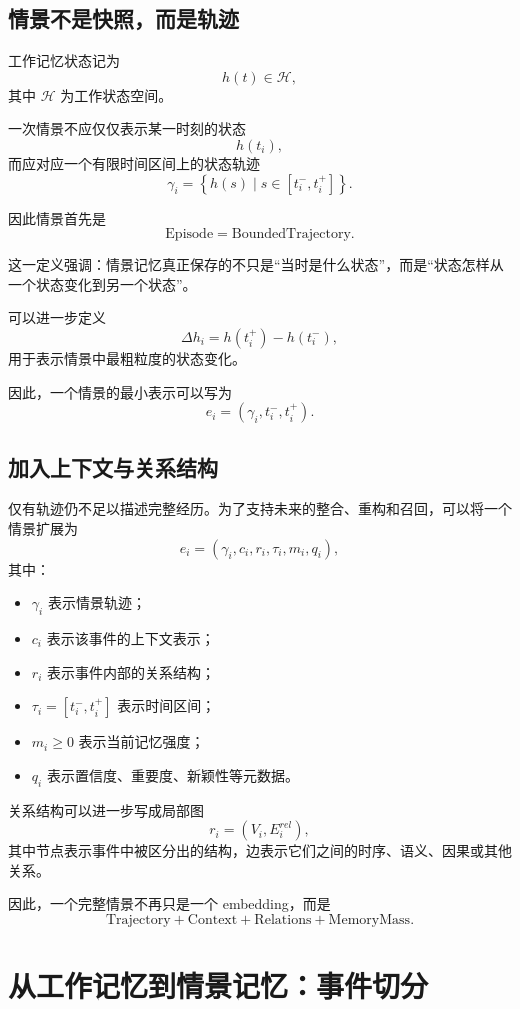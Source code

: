 \subsection{情景不是快照，而是轨迹}

工作记忆状态记为
\[
h(t)\in\mathcal{H},
\]
其中 $\mathcal{H}$ 为工作状态空间。

一次情景不应仅仅表示某一时刻的状态
\[
h(t_i),
\]
而应对应一个有限时间区间上的状态轨迹
\[
\gamma_i
=
\left\{
h(s)
\mid
s\in[t_i^{-},t_i^{+}]
\right\}.
\]

因此情景首先是
\[
\boxed{
\mathrm{Episode}
=
\mathrm{BoundedTrajectory}.
}
\]

这一定义强调：情景记忆真正保存的不只是“当时是什么状态”，而是“状态怎样从一个状态变化到另一个状态”。

可以进一步定义
\[
\Delta h_i
=
h(t_i^{+})
-
h(t_i^{-}),
\]
用于表示情景中最粗粒度的状态变化。

因此，一个情景的最小表示可以写为
\[
e_i
=
\left(
\gamma_i,
t_i^{-},
t_i^{+}
\right).
\]

\subsection{加入上下文与关系结构}

仅有轨迹仍不足以描述完整经历。为了支持未来的整合、重构和召回，可以将一个情景扩展为
\[
\boxed{
e_i
=
\left(
\gamma_i,
c_i,
r_i,
\tau_i,
m_i,
q_i
\right),
}
\]
其中：

\begin{itemize}
    \item $\gamma_i$ 表示情景轨迹；
    \item $c_i$ 表示该事件的上下文表示；
    \item $r_i$ 表示事件内部的关系结构；
    \item $\tau_i=[t_i^{-},t_i^{+}]$ 表示时间区间；
    \item $m_i\geq0$ 表示当前记忆强度；
    \item $q_i$ 表示置信度、重要度、新颖性等元数据。
\end{itemize}

关系结构可以进一步写成局部图
\[
r_i
=
(V_i,E_i^{rel}),
\]
其中节点表示事件中被区分出的结构，边表示它们之间的时序、语义、因果或其他关系。

因此，一个完整情景不再只是一个 embedding，而是
\[
\boxed{
\mathrm{Trajectory}
+
\mathrm{Context}
+
\mathrm{Relations}
+
\mathrm{MemoryMass}.
}
\]

\section{从工作记忆到情景记忆：事件切分}

